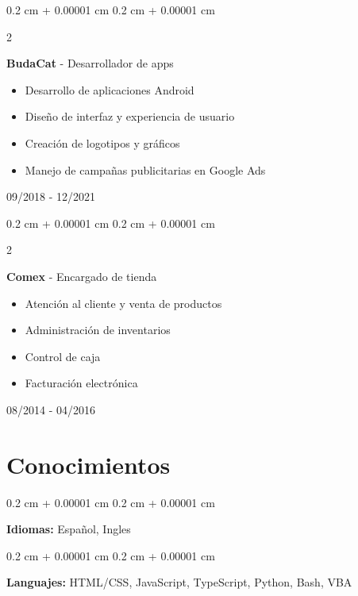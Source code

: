 \documentclass[12pt, letterpaper]{article}
\newenvironment{highlights}{
    \begin{itemize}[
        topsep=0.10 cm,
        parsep=0.10 cm,
        partopsep=0pt,
        itemsep=0pt,
        leftmargin=0.4 cm + 10pt
    ]
}{
    \end{itemize}
} %
\newenvironment{onecolentry}{
    \begin{adjustwidth}{
        0.2 cm + 0.00001 cm
    }{
        0.2 cm + 0.00001 cm
    }
}{
    \end{adjustwidth}
} %
\newenvironment{twocolentry}[2][]{
    \onecolentry
    \def\secondColumn{#2}
    \setcolumnwidth{\fill, 4.5 cm}
    \begin{paracol}{2}
}{
    \switchcolumn \raggedleft \secondColumn
    \end{paracol}
    \endonecolentry
} %
\begin{document}
\vspace{0.3 cm}

\begin{twocolentry}{

        09/2018 - 12/2021
    }
    \textbf{BudaCat} - Desarrollador de apps
    \begin{highlights}
        \item Desarrollo de aplicaciones Android
        \item Diseño de interfaz y experiencia de usuario
        \item Creación de logotipos y gráficos
        \item Manejo de campañas publicitarias en Google Ads
    \end{highlights}
\end{twocolentry}

\vspace{0.3 cm}

\begin{twocolentry}{

        08/2014 - 04/2016
    }
    \textbf{Comex} - Encargado de tienda
    \begin{highlights}
        \item Atención al cliente y venta de productos
        \item Administración de inventarios
        \item Control de caja
        \item Facturación electrónica
    \end{highlights}
\end{twocolentry}

\vspace{0.5 cm}

\section{Conocimientos}

\vspace{0.2 cm}

\begin{onecolentry}
    \textbf{Idiomas:} Español, Ingles
\end{onecolentry}

\vspace{0.2 cm}

\begin{onecolentry}
    \textbf{Languajes:} HTML/CSS, JavaScript, TypeScript, Python, Bash, VBA
\end{onecolentry}
\end{document}

